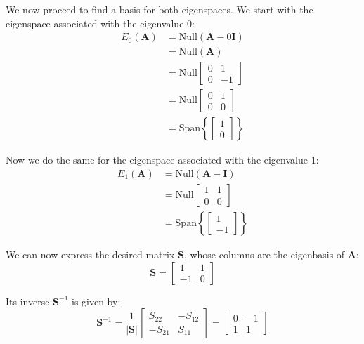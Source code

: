 \documentclass{article}
\begin{document}
We now proceed to find a basis for both eigenspaces. We start with the eigenspace associated with the eigenvalue 0:
\begin{align*}
    E_0(\mathbf{A})&=\text{Null}(\mathbf{A}-0\mathbf{I})\tag{def. of eigenspace}\\
    &=\text{Null}(\mathbf{A})\\
    &=\text{Null}\begin{bmatrix} 0 & 1 \\ 0 & -1 \end{bmatrix}\\
    &=\text{Null}\begin{bmatrix} 0 & 1 \\ 0 & 0 \end{bmatrix}\tag{rref}\\
    &=\text{Span}\left\{\begin{bmatrix} 1\\0\end{bmatrix}\right\}\tag{$x_2=0$, $x_1$ free}
\end{align*}

Now we do the same for the eigenspace associated with the eigenvalue 1:
\begin{align*}
    E_1(\mathbf{A})&=\text{Null}(\mathbf{A}-\mathbf{I})\tag{def. of eigenspace}\\
    &=\text{Null}\begin{bmatrix} 1 & 1 \\ 0 & 0 \end{bmatrix}\\
    &=\text{Span}\left\{\begin{bmatrix} 1\\-1\end{bmatrix}\right\}\tag{$x_2=-x_1$}
\end{align*}

We can now express the desired matrix $\mathbf{S}$, whose columns are the eigenbasis of $\mathbf{A}$:
\begin{equation*}
    \mathbf{S}=\begin{bmatrix} 1&1\\-1&0\end{bmatrix}
\end{equation*}

Its inverse $\mathbf{S}^{-1}$ is given by:
\begin{equation*}
\mathbf{S}^{-1}=\frac{1}{|\mathbf{S}|}\begin{bmatrix} S_{22}&-S_{12}\\-S_{21}&S_{11}\end{bmatrix}=\begin{bmatrix} 0&-1\\1&1\end{bmatrix}
\end{equation*}
\end{document}
